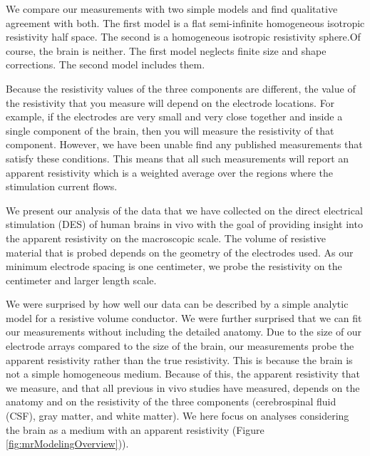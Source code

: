 We compare our measurements with two simple models and find qualitative agreement with both. The first model is a flat semi-infinite homogeneous isotropic resistivity half space. The second is a homogeneous isotropic resistivity sphere.Of course, the brain is neither. The first model neglects finite size and shape corrections. The second model includes them.

Because the resistivity values of the three components are different, the value of the resistivity that you measure will depend on the electrode locations. For example, if the electrodes are very small and very close together and inside a single component of the brain, then you will measure the resistivity of that component. However, we have been unable find any published measurements that satisfy these conditions. This means that all such measurements will report an apparent resistivity which is a weighted average over the regions where the stimulation current flows.

We present our analysis of the data that we have collected on the direct electrical stimulation (DES) of human brains in vivo with the goal of providing insight into the apparent resistivity on the macroscopic scale. The volume of resistive material that is probed depends on the geometry of the electrodes used. As our minimum electrode spacing is one centimeter, we probe the resistivity on the centimeter and larger length scale.

We were surprised by how well our data can be described by a simple analytic model for a resistive volume conductor. We were further surprised that we can fit our measurements without including the detailed anatomy. Due to the size of our electrode arrays compared to the size of the brain, our measurements probe the apparent resistivity rather than the true resistivity. This is because the brain is not a simple homogeneous medium. Because of this, the apparent resistivity that we measure, and that all previous in vivo studies have measured, depends on the anatomy and on  the resistivity of the three components (cerebrospinal fluid (CSF), gray matter, and white matter). We here focus on analyses considering the brain as a medium with an apparent resistivity (Figure \ref{fig:mrModelingOverview})). 



